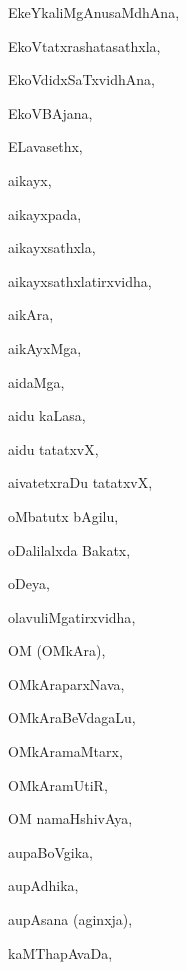 \begin{multicols}{3}
{\noindent
{EkeYkaliMgAnusaMdhAna}, \pageref{EkeYkaliMgAnusaMdhAna}

\noindent
{EkoVtatxrashatasathxla}, \pageref{EkoVtatxrashatasathxla}

\noindent
{EkoVdidxSaTxvidhAna}, \pageref{EkoVdidxSaTxvidhAna}

\noindent
{EkoVBAjana}, \pageref{EkoVBAjana}

\noindent
{ELavasethx}, \pageref{ELavasethx}

\noindent
{aikayx}, \pageref{aikayx}

\noindent
{aikayxpada}, \pageref{aikayxpada}

\noindent
{aikayxsathxla}, \pageref{aikayxsathxla}

\noindent
{aikayxsathxlatirxvidha}, \pageref{aikayxsathxlatirxvidha}

\noindent
{aikAra}, \pageref{aikAra}

\noindent
{aikAyxMga}, \pageref{aikAyxMga}

\noindent
{aidaMga}, \pageref{aidaMga}

\noindent
{aidu kaLasa}, \pageref{aidu kaLasa}

\noindent
{aidu tatatxvX}, \pageref{aidu tatatxvX}

\noindent
{aivatetxraDu tatatxvX}, \pageref{aivatetxraDu tatatxvX}

\noindent
{oMbatutx bAgilu}, \pageref{oMbatutx bAgilu}

\noindent
{oDalilalxda Bakatx}, \pageref{oDalilalxda Bakatx}

\noindent
{oDeya}, \pageref{oDeya}

\noindent
{olavuliMgatirxvidha}, \pageref{olavuliMgatirxvidha}

\noindent
{OM (OMkAra)}, \pageref{OM (OMkAra)}

\noindent
{OMkAraparxNava}, \pageref{OMkAraparxNava}

\noindent
{OMkAraBeVdagaLu}, \pageref{OMkAraBeVdagaLu}

\noindent
{OMkAramaMtarx}, \pageref{OMkAramaMtarx}

\noindent
{OMkAramUtiR}, \pageref{OMkAramUtiR}

\noindent
{OM namaHshivAya}, \pageref{OM namaHshivAya}

\noindent
{aupaBoVgika}, \pageref{aupaBoVgika}

\noindent
{aupAdhika}, \pageref{aupAdhika}

\noindent
{aupAsana (aginxja)}, \pageref{aupAsana (aginxja)}

\noindent
{kaMThapAvaDa}, \pageref{kaMThapAvaDa}

}
\end{multicols}
